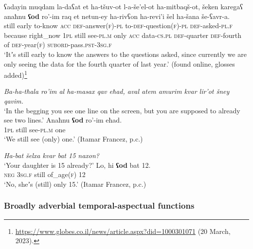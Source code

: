 \begin{exe}
	\ex \label{appendixHebrewOdScalar3}
	\gll ʕadayin muqdam la-daʕat et ha-tšuv-ot l-a-še\rq{}el-ot ha-mitbaqš-ot, šeken karegaʕ anaħnu \textbf{ʕod} ro\rq{}-im raq et netun-ey ha-rivʕon ha-revi\rq{}i šel ha-šana še-ʕavr-a.\\
	still early to-know \textsc{acc} \textsc{def}-answer(\textsc{f})-\textsc{pl}
to-\textsc{def}-question(\textsc{f})-\textsc{pl} \textsc{def}-asked-\textsc{pl}.\textsc{f} because right\_now 1\textsc{pl} still see-\textsc{pl}.\textsc{m} only \textsc{acc} data-\textsc{cs}.\textsc{pl} \textsc{def}-quarter \textsc{def}-fourth of \textsc{def}-year(\textsc{f}) \textsc{subord}-pass.\textsc{pst}-3\textsc{sg}.\textsc{f}\\
\glt \lq Itʼs still early to know the answers to the questions asked, since currently we are only seeing the data for the fourth quarter of last year.\rq{ }(found online, glosses added)\footnote{\url{https://www.globes.co.il/news/article.aspx?did=1000301071} (20 March, 2023).}

	\ex \label{appendixHebrewOdScalar4}
	\begin{xlist}
		 \textit{Ba-ha-tħala ro\rq{}im al ha-masax qav eħad, aval atem amurim kvar lir\rq{}ot šney qavim.}\\
		\lq In the begging you see one line on the screen, but you are supposed to already see two lines.\rq
		\gll Anaħnu \textbf{ʕod} ro\rq{}-im eħad.\\
		1\textsc{pl} still see-\textsc{pl}.\textsc{m} one\\
		\glt \lq We still see (only) one.\rq{ }(Itamar Francez, p.c.)
\end{xlist}

	\ex \label{appendixHebrewOdScalar5}
	\begin{xlist}
		 \textit{Ha-bat šelxa kvar bat 15 naxon?}\\
		\lq Your daughter is 15 already?\rq{}
		 \gll Lo, hi \textbf{ʕod} bat 12.\\
		\textsc{neg} 3\textsc{sg}.\textsc{f} still of\_age(\textsc{f}) 12\\
		\glt \lq No, sheʼs (still) only 15.\rq{ }(Itamar Francez, p.c.)
	\end{xlist}
\end{exe}

\subsubsection{Broadly adverbial temporal-aspectual functions}
